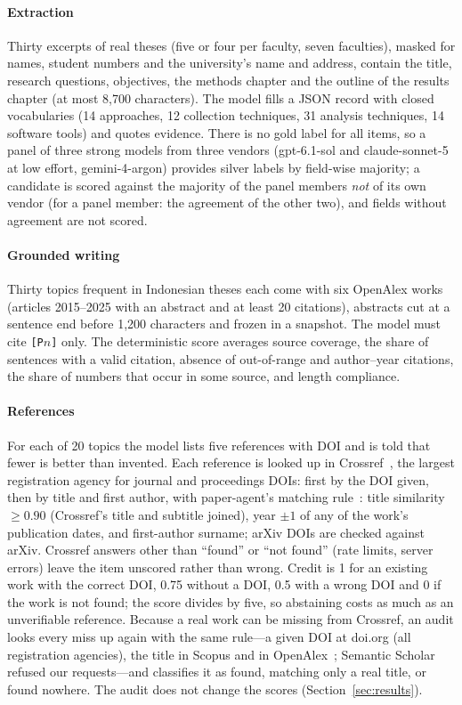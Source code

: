\paragraph{Extraction} Thirty excerpts of real theses (five or four per faculty, seven faculties), masked for names, student numbers and the university's name and address, contain the title, research questions, objectives, the methods chapter and the outline of the results chapter (at most 8{,}700 characters). The model fills a JSON record with closed vocabularies (14 approaches, 12 collection techniques, 31 analysis techniques, 14 software tools) and quotes evidence. There is no gold label for all items, so a panel of three strong models from three vendors (gpt-6.1-sol and claude-sonnet-5 at low effort, gemini-4-argon) provides silver labels by field-wise majority; a candidate is scored against the majority of the panel members \emph{not} of its own vendor (for a panel member: the agreement of the other two), and fields without agreement are not scored.

\paragraph{Grounded writing} Thirty topics frequent in Indonesian theses each come with six OpenAlex works (articles 2015--2025 with an abstract and at least 20 citations), abstracts cut at a sentence end before 1{,}200 characters and frozen in a snapshot. The model must cite \texttt{[P$n$]} only. The deterministic score averages source coverage, the share of sentences with a valid citation, absence of out-of-range and author--year citations, the share of numbers that occur in some source, and length compliance.

\paragraph{References} For each of 20 topics the model lists five references with DOI and is told that fewer is better than invented. Each reference is looked up in Crossref~\cite{hendricks2020crossref}, the largest registration agency for journal and proceedings DOIs: first by the DOI given, then by title and first author, with paper-agent's matching rule~\cite{arya2026paperagent}: title similarity $\ge 0.90$ (Crossref's title and subtitle joined), year $\pm 1$ of any of the work's publication dates, and first-author surname; arXiv DOIs are checked against arXiv. Crossref answers other than ``found'' or ``not found'' (rate limits, server errors) leave the item unscored rather than wrong. Credit is 1 for an existing work with the correct DOI, 0.75 without a DOI, 0.5 with a wrong DOI and 0 if the work is not found; the score divides by five, so abstaining costs as much as an unverifiable reference. Because a real work can be missing from Crossref, an audit looks every miss up again with the same rule---a given DOI at doi.org (all registration agencies), the title in Scopus and in OpenAlex~\cite{priem2022openalex}; Semantic Scholar refused our requests---and classifies it as found, matching only a real title, or found nowhere. The audit does not change the scores (Section~\ref{sec:results}).

